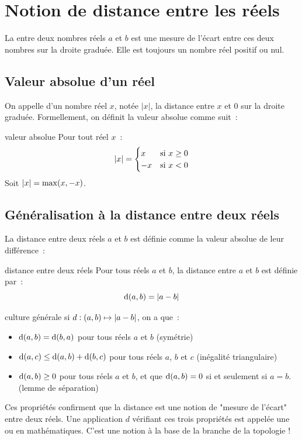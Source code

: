 \section{Notion de distance entre les réels}
La  entre deux nombres réels $a$ et $b$ est une mesure de l'écart entre ces deux nombres sur la droite graduée. Elle est toujours un nombre réel positif ou nul.

\subsection{Valeur absolue d'un réel}

On appelle  d'un nombre réel $x$, notée $|x|$, la distance entre $x$ et $0$ sur la droite graduée. Formellement, on définit la valeur absolue comme suit~:
\begin{definition}{}{valeur absolue}
    Pour tout réel $x$~:
    \[
    |x| = 
    \begin{cases} 
    x & \text{si } x \geq 0 \\ 
    -x & \text{si } x < 0 
    \end{cases}
    \]
    Soit $|x| = \max(x,-x)$.
\end{definition}

\subsection{Généralisation à la distance entre deux réels}

La distance entre deux réels $a$ et $b$ est définie comme la valeur absolue de leur différence~:
\begin{definition}{}{distance entre deux réels}
    Pour tous réels $a$ et $b$, la distance entre $a$ et $b$ est définie par~:
    $$ \mathrm{d}(a, b) = |a - b| $$
\end{definition}

\begin{remarque}{}{culture générale}
    si $d : (a,b) \mapsto |a-b|$, on a que~:
    \begin{itemize}
        \item $\mathrm{d}(a, b) = \mathrm{d}(b, a)$ pour tous réels $a$ et $b$ (symétrie)
        \item $\mathrm{d}(a, c) \leq \mathrm{d}(a, b) + \mathrm{d}(b, c)$ pour tous réels $a$, $b$ et $c$ (inégalité triangulaire)
        \item $\mathrm{d}(a, b) \geq 0$ pour tous réels $a$ et $b$, et que $\mathrm{d}(a, b) = 0$ si et seulement si $a = b$. (lemme de séparation)
    \end{itemize}
    Ces propriétés confirment que la distance est une notion de "mesure de l'écart" entre deux réels. Une application $d$ vérifiant ces trois propriétés est appelée une  ou  en mathématiques. C'est une notion à la base de la branche de la topologie !
\end{remarque}


